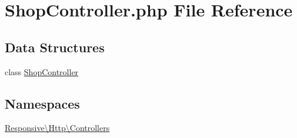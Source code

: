 \hypertarget{_shop_controller_8php}{}\section{Shop\+Controller.\+php File Reference}
\label{_shop_controller_8php}
\subsection*{Data Structures}
\begin{DoxyCompactItemize}
\item 
class \mbox{\hyperlink{class_responsive_1_1_http_1_1_controllers_1_1_shop_controller}{Shop\+Controller}}
\end{DoxyCompactItemize}
\subsection*{Namespaces}
\begin{DoxyCompactItemize}
\item 
 \mbox{\hyperlink{namespace_responsive_1_1_http_1_1_controllers}{Responsive\textbackslash{}\+Http\textbackslash{}\+Controllers}}
\end{DoxyCompactItemize}
